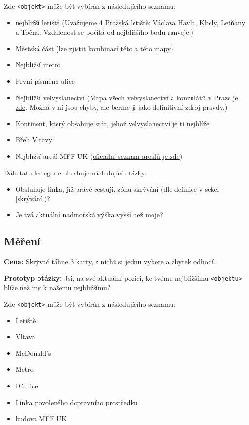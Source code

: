 Zde \verb|<objekt>| může být vybírán z následujícího seznamu:

\begin{itemize}
	\item nejbližší letiště (Uvažujeme 4 Pražská letiště: Václava Havla, Kbely, Letňany a Točná. Vzdálenost se počítá od nejbližšího bodu ranveje.)
	\item Městská část (lze zjistit kombinací \href{https://bezpecnost.praha.eu/mapy/zakladni-mapa-hranic}{této} a \href{https://www.mapa-prahy.com/mestske-casti-prahy}{této} mapy)
	\item Nejbližší metro
	\item První písmeno ulice
	\item Nejbližší velvyslanectví (\href{https://mapy.com/s/lafujohule}{Mapa všech velvyslanectví a konzulátů v Praze je zde}. Možná v ní jsou chyby, ale berme ji jako definitivní zdroj pravdy.)
	\item Kontinent, který obsahuje stát, jehož velvyslanectví je ti nejblíže
	\item Břeh Vltavy
	\item Nejbližší areál MFF UK (\href{https://www.mff.cuni.cz/cs/vnitrni-zalezitosti/budovy-a-arealy}{oficiální seznam areálů je zde})
\end{itemize}

Dále tato kategorie obsahuje následující otázky:

\begin{itemize}
	\item Obsluhuje linka, jíž právě cestuji, zónu skrývání (dle definice v sekci \ref{skrývání})?
	\item Je tvá aktuální nadmořská výška vyšší než moje?
\end{itemize}


\subsection{Měření}

\textbf{Cena:} Skrývač táhne 3 karty, z nichž si jednu vybere a zbytek odhodí.

\textbf{Prototyp otázky:} Jsi, na své aktuální pozici, ke tvému nejbližšímu \verb|<objektu>| blíže než my k našemu nejbližšímu?

Zde \verb|<objekt>| může být vybírán z následujícího seznamu:

\begin{itemize}
	\item Letiště
	\item Vltava
	\item McDonald's
	\item Metro
	\item Dálnice
	\item Linka povoleného dopravního prostředku
	\item budova MFF UK
\end{itemize}


